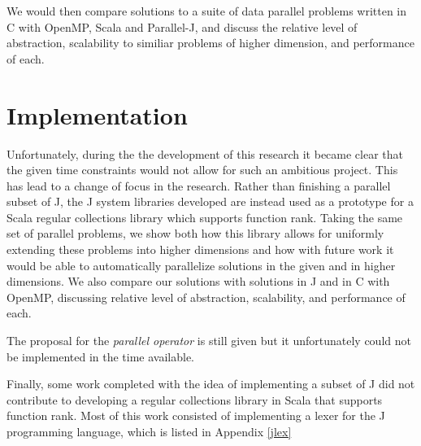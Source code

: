 We would then compare solutions to a suite of data parallel problems written in C with OpenMP, Scala and Parallel-J,
and discuss the relative level of abstraction, scalability to similiar problems of higher dimension, and performance of each.

\section{Implementation}
\label{imp}
Unfortunately, during the the development of this research it became clear that the given time constraints would not allow for such an ambitious project.
This has lead to a change of focus in the research. 
Rather than finishing a parallel subset of J, the J system libraries developed 
are instead used as a prototype for a Scala regular collections library which supports function rank.
Taking the same set of parallel problems, we show both how this library allows for uniformly extending these problems into higher dimensions and 
how with future work it would be able to automatically parallelize solutions in the given and in higher dimensions.
We also compare our solutions with solutions in J and in C with OpenMP, discussing relative level of abstraction, scalability, and performance of each.

The proposal for the \textit{parallel operator} is still given but it unfortunately could not be implemented in the time available.

Finally, some work completed with the idea of implementing a subset of J did not contribute to developing a regular collections library in Scala that supports function rank.
Most of this work consisted of implementing a lexer for the J programming language, which is listed in Appendix \ref{jlex}
